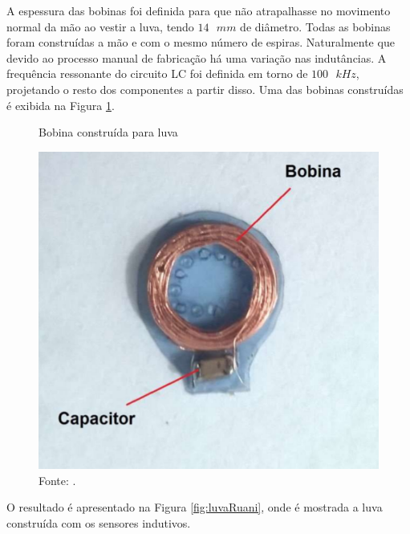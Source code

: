 	
A espessura das bobinas foi definida para que não atrapalhasse no movimento normal da mão ao vestir a luva, tendo $14\textrm{ }mm$ de 
diâmetro. Todas as bobinas foram construídas a mão e com o mesmo número de espiras. Naturalmente que devido ao processo manual de 
fabricação há uma variação nas indutâncias. A frequência ressonante  do circuito LC foi definida em torno de $100\textrm{ }kHz$, 
projetando o 
resto dos componentes a partir disso. Uma das bobinas construídas é exibida na Figura \ref{fig:bobinas}.


	\begin{figure}[H]
		\vspace{4mm}
		\centering
		\caption{Bobina construída para luva}
		\label{fig:bobinas}
		\includegraphics[scale=0.25]{imagens/SensorIndutivo.png}
		\caption*{Fonte: .}		
	\end{figure}

 O resultado é apresentado na Figura \ref{fig:luvaRuani}, onde é mostrada a luva construída com os sensores indutivos.

